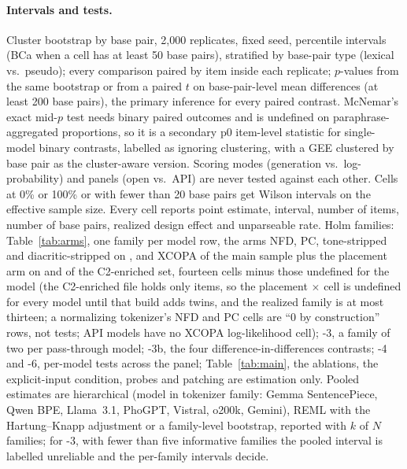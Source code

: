 \paragraph{Intervals and tests.}
Cluster bootstrap by base pair, 2,000 replicates, fixed seed, percentile intervals (BCa when a cell has at least 50 base pairs), stratified by base-pair type (lexical vs.\ pseudo); every comparison paired by item inside each replicate; $p$-values from the same bootstrap or from a paired $t$ on base-pair-level mean differences (at least 200 base pairs), the primary inference for every paired contrast. McNemar's exact mid-$p$ test needs binary paired outcomes and is undefined on paraphrase-aggregated proportions, so it is a secondary p0 item-level statistic for single-model binary contrasts, labelled as ignoring clustering, with a GEE clustered by base pair as the cluster-aware version. Scoring modes (generation vs.\ log-probability) and panels (open vs.\ API) are never tested against each other. Cells at 0\% or 100\% or with fewer than 20 base pairs get Wilson intervals on the effective sample size. Every cell reports point estimate, interval, number of items, number of base pairs, realized design effect and unparseable rate. Holm families: Table~\ref{tab:arms}, one family per model row, the arms NFD, PC, tone-stripped and diacritic-stripped on ,  and XCOPA of the main sample plus the placement arm on  and  of the C2-enriched set, fourteen cells minus those undefined for the model (the C2-enriched file holds only  items, so the placement $\times$  cell is undefined for every model until that build adds  twins, and the realized family is at most thirteen; a normalizing tokenizer's NFD and PC cells are ``0 by construction'' rows, not tests; API models have no XCOPA log-likelihood cell); \hyp{3}, a family of two per pass-through model; \hyp{3b}, the four difference-in-differences contrasts; \hyp{4} and \hyp{6}, per-model tests across the panel; Table~\ref{tab:main}, the ablations, the explicit-input condition, probes and patching are estimation only. Pooled estimates are hierarchical (model in tokenizer family: Gemma SentencePiece, Qwen BPE, Llama~3.1, PhoGPT, Vistral, o200k, Gemini), REML with the Hartung--Knapp adjustment or a family-level bootstrap, reported with $k$ of $N$ families; for \hyp{3}, with fewer than five informative families the pooled interval is labelled unreliable and the per-family intervals decide.

